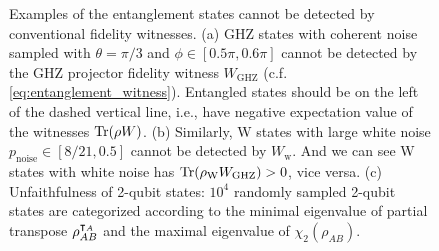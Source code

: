\documentclass[
aps,
pra,
twocolumn,
floatfix,
]{revtex4-2}
\theoremstyle{plain}
\theoremstyle{definition}
\newcommand{\ew}{W}
\newcommand{\dm}{\rho}
\newcommand{\ghz}{\text{GHZ}}
\newcommand{\noise}{\text{noise}}
\begin{document}
\begin{figure}[!ht]
	\caption{Examples of the entanglement states cannot be detected by conventional fidelity witnesses. (a) GHZ states with coherent noise sampled with $\theta=\pi/3$ and $\phi\in[0.5\pi,0.6\pi]$ cannot be detected by the GHZ projector fidelity witness $W_{\ghz}$ (c.f. \cref{eq:entanglement_witness}). Entangled states should be on the left of the dashed vertical line, i.e., have negative expectation value of the witnesses $\Tr(\dm\ew)$. (b) Similarly, W states with large white noise $p_{\noise}\in[8/21,0.5]$ cannot be detected by $W_{\text{w}}$. And we can see W states with white noise has $\Tr(\dm_{\text{W}}\ew_{\ghz})>0$, vice versa. (c) Unfaithfulness of 2-qubit states: $10^4$ randomly sampled 2-qubit states are categorized according to the minimal eigenvalue of partial transpose $\dm_{AB}^{\T_A}$ and the maximal eigenvalue of $\chi_2(\dm_{AB})$.}
	\label{fig:conventional_witness}
\end{figure}
\end{document}
